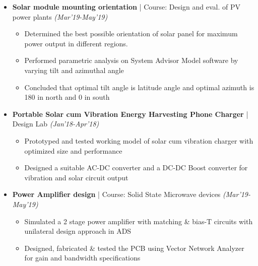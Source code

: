 \documentclass[a4paper, 10pt]{article}
\newcommand{\isep}{-2 pt}
\begin{document}
\begin{itemize} \itemsep \isep 
\vspace{-0.01cm}
\item \textbf{\large Solar module mounting orientation} | Course: Design and eval. of PV power plants \hfill \emph{(Mar'19-May'19)} \\
	\begin{itemize}\itemsep \isep
	\vspace{-0.70cm}
 \item Determined the best possible orientation of solar panel for maximum power output in different regions.
\item Performed parametric analysis on System Advisor Model software by varying tilt and azimuthal angle%
\item Concluded that optimal tilt angle is latitude angle and optimal azimuth is 180 in north and 0 in south
 	\end{itemize}
\vspace{-0.18cm}

\item \textbf{\large Portable Solar cum Vibration Energy Harvesting Phone Charger} | Design Lab \hfill \emph{(Jan'18-Apr'18)} \\
\begin{itemize}\itemsep \isep
	\vspace{-0.70cm}
			\item Prototyped and tested working model of solar cum vibration charger with optimized size and performance
\item Designed a suitable AC-DC converter and a DC-DC Boost converter for vibration and solar circuit output
\end{itemize}
\vspace{-0.18cm}

\item \textbf{\large Power Amplifier design} | Course: Solid State Microwave devices \hfill \emph{(Mar'19-May'19)} \\
	\begin{itemize}\itemsep \isep
	\vspace{-0.70cm}
		\item Simulated a 2 stage power amplifier with matching \& bias-T circuits with unilateral design approach in ADS 
	\item Designed, fabricated \& tested the PCB using Vector Network Analyzer for gain and bandwidth specifications
	\end{itemize}


\end{itemize}
\end{document}
